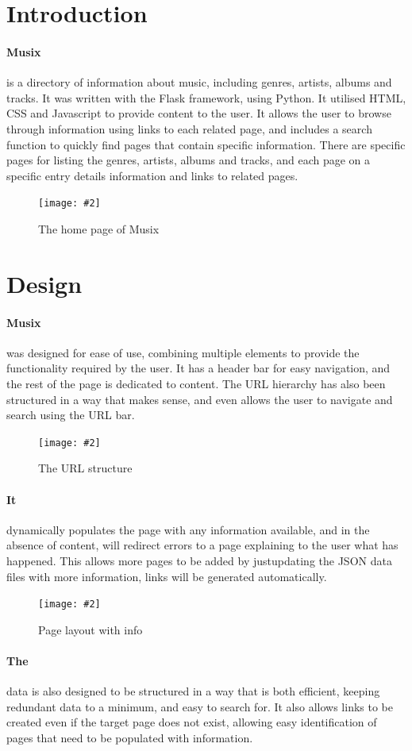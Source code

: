 \documentclass[10pt, a4paper]{article}
\title{\mytitle}
\author{\myauthor\hspace{1em}\\\contact\\Edinburgh Napier University\hspace{0.5em}-\hspace{0.5em}\mymodule}
\date{}
\newcommand{\figuremacro}[5]{
    \begin{figure}[#1]
        \centering
        \texttt{[image: \#2]}
        \caption[#3]{\textbf{#3}#4}
        \label{fig:#2}
    \end{figure}
}
\begin{document}
    \maketitle
    
    \section{Introduction}
    \paragraph{Musix} is a directory of information about music, including genres, artists, albums and tracks. It was written with the Flask framework, using Python. It utilised HTML, CSS and Javascript to provide content to the user. It allows the user to browse through information using links to each related page, and includes a search function to quickly find pages that contain specific information. There are specific pages for listing the genres, artists, albums and tracks, and each page on a specific entry details information and links to related pages.
    
    \figuremacro{h}{images/main.png}{}{The home page of Musix}{1.0}
    
    \section{Design}
    \paragraph{Musix} was designed for ease of use, combining multiple elements to provide the functionality required by the user. It has a header bar for easy navigation, and the rest of the page is dedicated to content. The URL hierarchy has also been structured in a way that makes sense, and even allows the user to navigate and search using the URL bar.
    \figuremacro{H}{images/URL.png}{}{The URL structure}{1.0}
    \paragraph{It} dynamically populates the page with any information available, and in the absence of content, will redirect errors to a page explaining to the user what has happened. This allows more pages to be added by justupdating the JSON data files with more information, links will be generated automatically.
    \figuremacro{H}{images/Page.PNG}{}{Page layout with info}{1.0}
    \paragraph{The} data is also designed to be structured in a way that is both efficient, keeping redundant data to a minimum, and easy to search for. It also allows links to be created even if the target page does not exist, allowing easy identification of pages that need to be populated with information.
    
\end{document}
